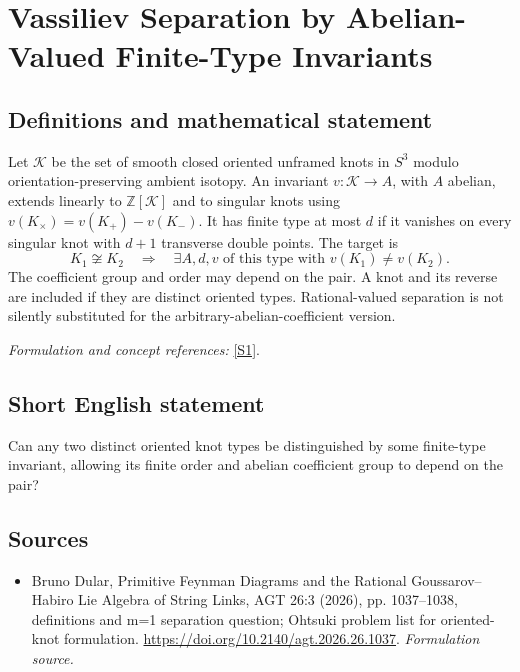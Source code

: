 \documentclass[11pt]{article}
\begin{document}
\section*{\texorpdfstring{Vassiliev Separation by Abelian-Valued Finite-Type Invariants}{Vassiliev Separation by Abelian-Valued Finite-Type Invariants}}\label{30006838}
\subsection{Definitions and mathematical statement}
Let $\mathcal K$ be the set of smooth closed oriented unframed knots in $S^3$ modulo orientation-preserving ambient isotopy. An invariant $v:\mathcal K\to A$, with $A$ abelian, extends linearly to ${\mathbb{Z}}[\mathcal K]$ and to singular knots using
$v(K_\times)=v(K_+)-v(K_-)$. It has finite type at most $d$ if it vanishes on every singular knot with $d+1$ transverse double points. The target is
\[
 K_1\not\cong K_2\quad\Longrightarrow\quad
 \exists A,d,v\text{ of this type with }v(K_1)\ne v(K_2).
\]
The coefficient group and order may depend on the pair. A knot and its reverse are included if they are distinct oriented types. Rational-valued separation is not silently substituted for the arbitrary-abelian-coefficient version.
\par\smallskip\textit{Formulation and concept references:} \href{https://doi.org/10.2140/agt.2026.26.1037}{[S1]}.

\subsection{Short English statement}
Can any two distinct oriented knot types be distinguished by some finite-type invariant, allowing its finite order and abelian coefficient group to depend on the pair?
\subsection{Sources}
\begin{itemize}
\item[S1]Bruno Dular, Primitive Feynman Diagrams and the Rational Goussarov–Habiro Lie Algebra of String Links, AGT 26:3 (2026), pp. 1037–1038, definitions and m=1 separation question; Ohtsuki problem list for oriented-knot formulation.
\url{https://doi.org/10.2140/agt.2026.26.1037}.
\textit{Formulation source.}
\end{itemize}
\end{document}
